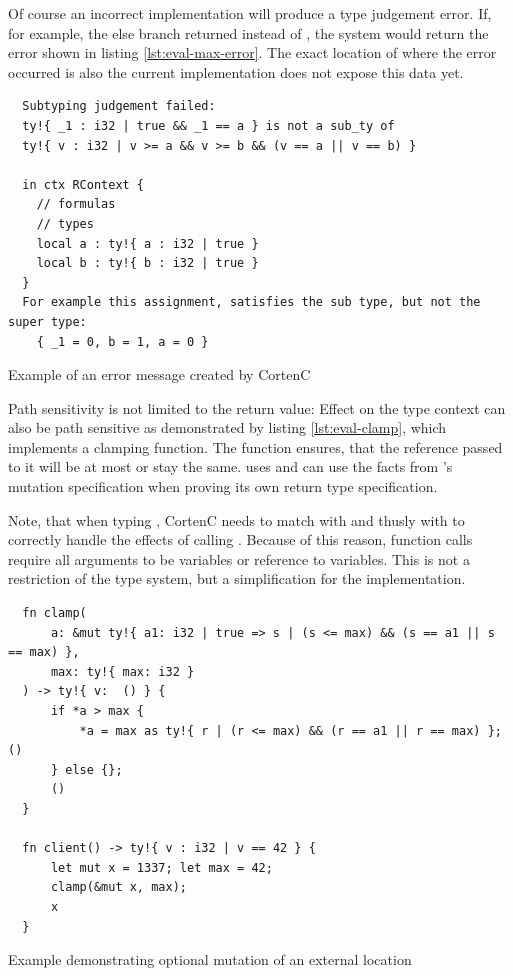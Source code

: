 \documentclass[twoside, english]{sdqthesis}
\theoremstyle{definition}
\begin{document}
Of course an incorrect implementation will produce a type judgement error. If, for example, the else branch returned  instead of , the system would return the error shown in listing \ref{lst:eval-max-error}. The exact location of where the error occurred is also the current implementation does not expose this data yet.

\begin{listing}[ht]
  \begin{verbatim}
  Subtyping judgement failed: 
  ty!{ _1 : i32 | true && _1 == a } is not a sub_ty of 
  ty!{ v : i32 | v >= a && v >= b && (v == a || v == b) } 

  in ctx RContext {
    // formulas
    // types
    local a : ty!{ a : i32 | true }
    local b : ty!{ b : i32 | true }
  }
  For example this assignment, satisfies the sub type, but not the super type:
    { _1 = 0, b = 1, a = 0 }
  \end{verbatim}
  \caption{Example of an error message created by CortenC}
  \label{lst:eval-max-error}
\end{listing}

Path sensitivity is not limited to the return value: Effect on the type context can also be path sensitive as demonstrated by listing \ref{lst:eval-clamp}, which implements a clamping function. The function  ensures, that the reference passed to it will be at most  or stay the same.  uses  and can use the facts from 's mutation specification when proving its own return type specification.

Note, that when typing , CortenC needs to match  with  and thusly  with  to correctly handle the effects of calling . Because of this reason, function calls require all arguments to be variables or reference to variables. This is not a restriction of the type system, but a simplification for the implementation.

\begin{listing}[ht]
  \begin{verbatim}
  fn clamp(
      a: &mut ty!{ a1: i32 | true => s | (s <= max) && (s == a1 || s == max) }, 
      max: ty!{ max: i32 }
  ) -> ty!{ v:  () } {
      if *a > max {
          *a = max as ty!{ r | (r <= max) && (r == a1 || r == max) }; ()
      } else {};
      ()
  }

  fn client() -> ty!{ v : i32 | v == 42 } {
      let mut x = 1337; let max = 42;
      clamp(&mut x, max);
      x
  }
  \end{verbatim}
  \caption{Example demonstrating optional mutation of an external location}
  \label{lst:eval-clamp}
\end{listing}
\end{document}
